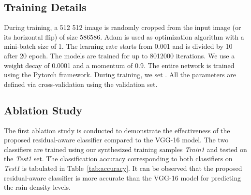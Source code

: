 \documentclass[10pt,twocolumn,letterpaper]{article}
\begin{document}
\subsection{Training Details}
 During training, a 512  512 image is randomly cropped from the input image (or its horizontal flip) of size 586586. Adam  is used as optimization algorithm with a mini-batch size of 1. The learning rate starts from 0.001 and is divided by 10 after 20 epoch.  The models are trained for up to 8012000 iterations. We use a weight decay of 0.0001 and a momentum of 0.9. The entire network is trained  using the Pytorch framework. During training, we set . All the parameters are defined via cross-validation using the validation set. 


\begin{table}
	\centering
	\caption{Quantitative results compared with three baseline configurations on \emph{Test1}.}
	\label{tab:baselinetable}
\end{table}

\subsection{Ablation Study}
The first ablation study is conducted to demonstrate the effectiveness of the proposed residual-aware classifier compared to the VGG-16 \cite{vgg} model. The two classifiers are trained using  our synthesized training samples \emph{Train1} and tested on the \emph{Test1} set. The classification accuracy corresponding to both classifiers on \emph{Test1} is tabulated in Table~\ref{tab:accuracy}. It can be observed that the proposed residual-aware classifier is more accurate than the VGG-16 model for predicting the rain-density levels.
\begin{table}
	\centering
	\caption{Accuracy of rain-density estimation evaluated on \emph{Test1}.}
	\label{tab:accuracy}
\end{table}
\end{document}
